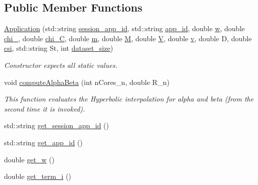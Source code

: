 \subsection*{Public Member Functions}
\begin{DoxyCompactItemize}
\item 
\hyperlink{classApplication_a3413eb5b5ba7bd2d1dfe2ce6d2e28c48}{Application} (std\-::string \hyperlink{classApplication_a6152c40564d526b9b60871c98f7a51c7}{session\-\_\-app\-\_\-id}, std\-::string \hyperlink{classApplication_a5cedee59cfd3cbf89d02174e2f521493}{app\-\_\-id}, double \hyperlink{classApplication_a89e171cf287b09ce4b37dd94c0d61e2b}{w}, double \hyperlink{classApplication_a6066fad4c229a6035652efd712d0d78c}{chi\-\_}, double \hyperlink{classApplication_a73d8a1604a2b2c99b14db1c8bd9c2798}{chi\-\_\-\-C}, double \hyperlink{classApplication_ad95ca8809237917d16779d7ed0013c8e}{m}, double \hyperlink{classApplication_a98cc47f6aa4ac3c70133d2922952ef7a}{M}, double \hyperlink{classApplication_a03a99fa3553c376653e53bb5f489c316}{V}, double \hyperlink{classApplication_a57853498c230af817bc4173169847bfc}{v}, double D, double \hyperlink{classApplication_a7c4d5b6d8d7b2c480008dbd958872ed2}{csi}, std\-::string St, int \hyperlink{classApplication_a83bcec93383a2816d9bbaa51b7dfa0c6}{dataset\-\_\-size})
\begin{DoxyCompactList}\small\item\em Constructor expects all static values. \end{DoxyCompactList}\item 
void \hyperlink{classApplication_a9e86a23b1be9e49c0a890f9cf1abb7fe}{compute\-Alpha\-Beta} (int n\-Cores\-\_\-n, double R\-\_\-n)
\begin{DoxyCompactList}\small\item\em This function evaluates the Hyperbolic interpolation for alpha and beta (from the second time it is invoked). \end{DoxyCompactList}\item 
std\-::string \hyperlink{classApplication_a76968cc06cb913a46b1b9c248fefced9}{get\-\_\-session\-\_\-app\-\_\-id} ()
\item 
std\-::string \hyperlink{classApplication_adff24fffdc7df386e03671cd084289a4}{get\-\_\-app\-\_\-id} ()
\item 
double \hyperlink{classApplication_a354b6b805f2993418260a8dd10368759}{get\-\_\-w} ()
\item 
double \hyperlink{classApplication_a19089a029251a3034747866c2084f4af}{get\-\_\-term\-\_\-i} ()
\item 

\end{DoxyCompactItemize}
